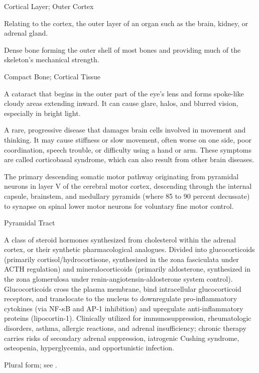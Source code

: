 \synonyms
Cortical Layer; Outer Cortex

 Relating to the cortex, the outer layer of an organ such as the brain, kidney, or adrenal gland.

 Dense bone forming the outer shell of most bones and providing much of the skeleton's mechanical strength.

\synonyms
Compact Bone; Cortical Tissue

 A cataract that begins in the outer part of the eye's lens and forms spoke-like cloudy areas extending inward. It can cause glare, halos, and blurred vision, especially in bright light.

 A rare, progressive disease that damages brain cells involved in movement and thinking. It may cause stiffness or slow movement, often worse on one side, poor coordination, speech trouble, or difficulty using a hand or arm. These symptoms are called corticobasal syndrome, which can also result from other brain diseases.

 The primary descending somatic motor pathway originating from pyramidal neurons in layer V of the cerebral motor cortex, descending through the internal capsule, brainstem, and medullary pyramids (where 85 to 90 percent decussate) to synapse on spinal lower motor neurons for voluntary fine motor control.

\synonyms
Pyramidal Tract

 A class of steroid hormones synthesized from cholesterol within the adrenal cortex, or their synthetic pharmacological analogues. Divided into glucocorticoids (primarily cortisol/hydrocortisone, synthesized in the zona fasciculata under ACTH regulation) and mineralocorticoids (primarily aldosterone, synthesized in the zona glomerulosa under renin-angiotensin-aldosterone system control). Glucocorticoids cross the plasma membrane, bind intracellular glucocorticoid receptors, and translocate to the nucleus to downregulate pro-inflammatory cytokines (via NF-$\kappa$B and AP-1 inhibition) and upregulate anti-inflammatory proteins (lipocortin-1). Clinically utilized for immunosuppression, rheumatologic disorders, asthma, allergic reactions, and adrenal insufficiency; chronic therapy carries risks of secondary adrenal suppression, iatrogenic Cushing syndrome, osteopenia, hyperglycemia, and opportunistic infection.

 Plural form; see .

